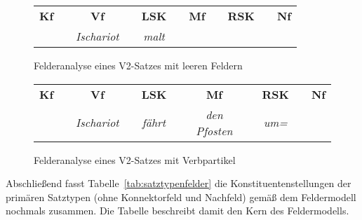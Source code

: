 \begin{figure}[!htbp]
  \centering
  \begin{tabular}{cp{0.1em}cp{0.1em}cp{0.1em}cp{0.1em}cp{0.1em}c}
    \textbf{Kf} && \textbf{Vf} && \textbf{LSK} && \textbf{Mf} && \textbf{RSK} && \textbf{Nf} \\
    \cmidrule{1-1}\cmidrule{3-3}\cmidrule{5-5}\cmidrule{7-7}\cmidrule{9-9}\cmidrule{11-11}
    && \textit{Ischariot} && \textit{malt} &&&&&& \\
  \end{tabular}
  \caption{Felderanalyse eines V2-Satzes mit leeren Feldern}
  \label{fig:leerefelder}
\end{figure}

\begin{figure}[!htbp]
  \centering
  \begin{tabular}{cp{0.1em}cp{0.1em}cp{0.1em}cp{0.1em}cp{0.1em}c}
    \textbf{Kf} && \textbf{Vf} && \textbf{LSK} && \textbf{Mf} && \textbf{RSK} && \textbf{Nf} \\
    \cmidrule{1-1}\cmidrule{3-3}\cmidrule{5-5}\cmidrule{7-7}\cmidrule{9-9}\cmidrule{11-11}
    && \textit{Ischariot} && \textit{fährt} && \textit{den Pfosten} && \textit{um=} & \\
  \end{tabular}
  \caption{Felderanalyse eines V2-Satzes mit Verbpartikel}
  \label{fig:verbpartikelalleinzuhaus}
\end{figure}

Abschließend fasst Tabelle~\ref{tab:satztypenfelder} die Konstituentenstellungen der primären Satztypen (ohne Konnektorfeld und Nachfeld) gemäß dem Feldermodell nochmals zusammen.
Die Tabelle beschreibt damit den Kern des Feldermodells.

\begin{table}
  \centering
  \caption{Besetzung der Felder in primären Satztypen laut Feldermodell}
  \label{tab:satztypenfelder}
\end{table}

